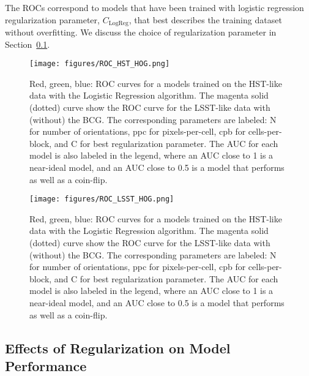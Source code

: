 \documentclass{emulateapj}
\begin{document}
The ROCs correspond to models that have been trained with logistic
regression regularization parameter, $C_\text{LogReg}$, that best
describes the training dataset without overfitting.  We discuss the
choice of regularization parameter in
Section~\ref{sec:regularizedfit}.

\begin{figure}[t]\label{fig:ROCHST}
\begin{center}
\texttt{[image: figures/ROC\_HST\_HOG.png]}
\caption{Red, green, blue: ROC curves for a models trained on the
  HST-like data with the Logistic Regression algorithm.  The magenta
  solid (dotted) curve show the ROC curve for the LSST-like data with
  (without) the BCG.  The corresponding parameters are labeled: N for
  number of orientations, ppc for pixels-per-cell, cpb for
  cells-per-block, and C for best regularization parameter.  The AUC
  for each model is also labeled in the legend, where an AUC close to
  1 is a near-ideal model, and an AUC close to 0.5 is a model that
  performs as well as a coin-flip.}
\end{center}
\end{figure}
\begin{figure}[t]\label{fig:ROCLSST}
\begin{center}
\texttt{[image: figures/ROC\_LSST\_HOG.png]}
\caption{Red, green, blue: ROC curves for a models trained on the
  HST-like data with the Logistic Regression algorithm.  The magenta
  solid (dotted) curve show the ROC curve for the LSST-like data with
  (without) the BCG.  The corresponding parameters are labeled: N for
  number of orientations, ppc for pixels-per-cell, cpb for
  cells-per-block, and C for best regularization parameter.  The AUC
  for each model is also labeled in the legend, where an AUC close to
  1 is a near-ideal model, and an AUC close to 0.5 is a model that
  performs as well as a coin-flip.}
\end{center}
\end{figure}

\subsection{Effects of Regularization on Model Performance}\label{sec:regularizedfit}
\end{document}
